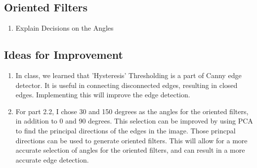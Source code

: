 \documentclass[12pt]{article}
\begin{document}
\subsection{Oriented Filters}
\begin{enumerate}
    \item Explain Decisions on the Angles
\end{enumerate}

\subsection{Ideas for Improvement}
\begin{enumerate}
    \item In class, we learned that 'Hysteresis' Thresholding is a part of Canny edge detector. It is useful in connecting disconnected edges, resulting in closed edges. Implementing this will improve the edge detection.
    \item For part 2.2, I chose 30 and 150 degrees as the angles for the oriented filters, in addition to 0 and 90 degrees. This selection can be improved by using PCA to find the principal directions of the edges in the image. Those princpal directions can be used to generate oriented filters. This will allow for a more accurate selection of angles for the oriented filters, and can result in a more accurate edge detection.
\end{enumerate}
\end{document}
